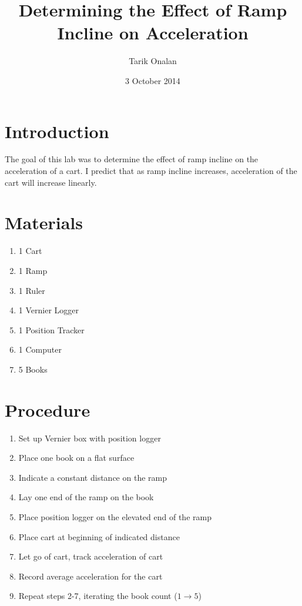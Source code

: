 \documentclass[a4paper]{article}
\title{Determining the Effect of Ramp Incline on Acceleration}
\date{3 October 2014}
\author{Tarik Onalan}
\begin{document}
    \maketitle
    \section{Introduction}
        The goal of this lab was to determine the effect of ramp incline on the
        acceleration of a cart. I predict that as ramp incline increases, acceleration
        of the cart will increase linearly.
    \section{Materials}
        \begin{enumerate}
            \item 1 Cart
            \item 1 Ramp
            \item 1 Ruler
            \item 1 Vernier Logger
            \item 1 Position Tracker
            \item 1 Computer
            \item 5 Books
        \end{enumerate}
    \section{Procedure}
        \begin{enumerate}
            \item Set up Vernier box with position logger
            \item Place one book on a flat surface
            \item Indicate a constant distance on the ramp
            \item Lay one end of the ramp on the book
            \item Place position logger on the elevated end of the ramp
            \item Place cart at beginning of indicated distance
            \item Let go of cart, track acceleration of cart
            \item Record average acceleration for the cart
            \item Repeat steps 2-7, iterating the book count (\(1\to5\))
        \end{enumerate}
\end{document}
